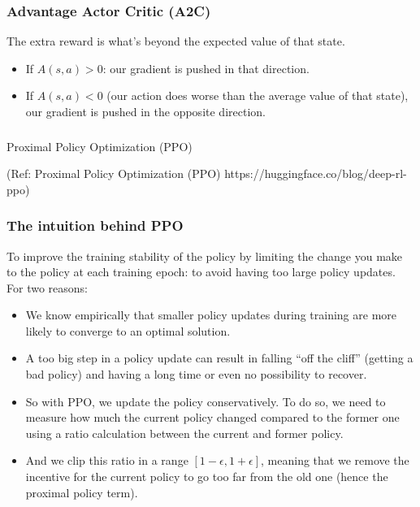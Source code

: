 \begin{frame}[fragile]\frametitle{Advantage Actor Critic (A2C)}

The extra reward is what's beyond the expected value of that state.

\begin{itemize}
\item If $A(s,a) > 0$: our gradient is pushed in that direction.
\item If $A(s,a) < 0$ (our action does worse than the average value of that state), our gradient is pushed in the opposite direction.
\end{itemize}

\end{frame}

\begin{frame}[fragile]\frametitle{}
\begin{center}
{\Large Proximal Policy Optimization (PPO)}
\end{center}

{\tiny (Ref: Proximal Policy Optimization (PPO) https://huggingface.co/blog/deep-rl-ppo)}

\end{frame}

\begin{frame}[fragile]\frametitle{The intuition behind PPO}

To improve the training stability of the policy by limiting the change you make to the policy at each training epoch: to avoid having too large policy updates. For two reasons:

\begin{itemize}
\item We know empirically that smaller policy updates during training are more likely to converge to an optimal solution.
\item A too big step in a policy update can result in falling ``off the cliff'' (getting a bad policy) and having a long time or even no possibility to recover.
\item So with PPO, we update the policy conservatively. To do so, we need to measure how much the current policy changed compared to the former one using a ratio calculation between the current and former policy. 
\item And we clip this ratio in a range $[1 - \epsilon, 1 + \epsilon]$, meaning that we remove the incentive for the current policy to go too far from the old one (hence the proximal policy term).
\end{itemize}

\end{frame}

